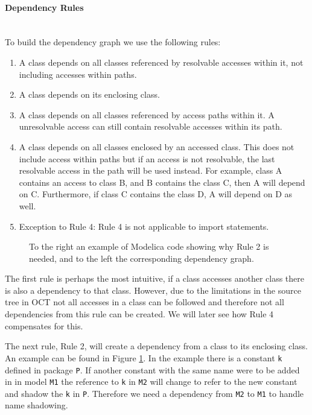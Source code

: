 \documentclass{cslthse-msc}
\begin{document}
\paragraph{Dependency Rules}\mbox{}\\
To build the dependency graph we use the following rules:
\begin{enumerate}
\item A class depends on all classes referenced by resolvable accesses within it, not including accesses within paths.
\item A class depends on its enclosing class. 
\item A class depends on all classes referenced by access paths within it. A unresolvable access can still contain resolvable accesses within its path.
\item A class depends on all classes enclosed by an accessed class. This does not include access within paths but if an access is not resolvable, the last resolvable access in the path will be used instead.
For example, class A contains an access to class B, and B contains the class C, then A will depend on C. Furthermore, if class C contains the class D, A will depend on D as well.
\item Exception to Rule 4: Rule 4 is not applicable to import statements.
\end{enumerate}


\begin{figure}[!htbp]
    \centering
    \qquad
    \subfloat{\raisebox{3.2 cm}{}}
    \caption{To the right an example of Modelica code showing why Rule 2 is needed, and to the left the corresponding dependency graph.}
    \label{fig:parentGraph}
\end{figure}
The first rule is perhaps the most intuitive, if a class accesses another class there is also a dependency to that class. However, due to the limitations in the source tree in OCT not all accesses in a class can be followed and therefore not all dependencies from this rule can be created. We will later see how Rule 4 compensates for this. 

The next rule, Rule 2, will create a dependency from a class to its enclosing class. An example can be found in Figure \ref{fig:parentGraph}. In the example there is a constant \texttt{k} defined in package \texttt{P}. If another constant with the same name were to be added in in model \texttt{M1} the reference to \texttt{k} in \texttt{M2} will change to refer to the new constant and shadow the \texttt{k} in \texttt{P}. Therefore we need a dependency from \texttt{M2} to \texttt{M1} to handle name shadowing.
\end{document}
